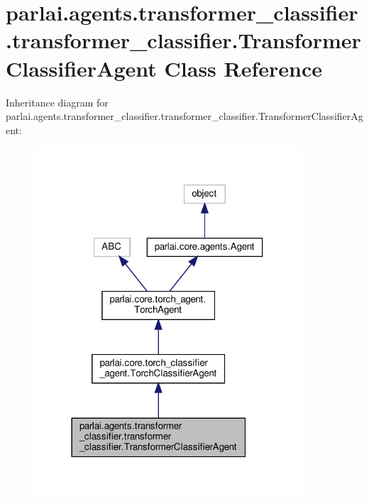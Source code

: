 \hypertarget{classparlai_1_1agents_1_1transformer__classifier_1_1transformer__classifier_1_1TransformerClassifierAgent}{}\section{parlai.\+agents.\+transformer\+\_\+classifier.\+transformer\+\_\+classifier.\+Transformer\+Classifier\+Agent Class Reference}
\label{classparlai_1_1agents_1_1transformer__classifier_1_1transformer__classifier_1_1TransformerClassifierAgent}


Inheritance diagram for parlai.\+agents.\+transformer\+\_\+classifier.\+transformer\+\_\+classifier.\+Transformer\+Classifier\+Agent\+:
\nopagebreak
\begin{figure}[H]
\begin{center}
\leavevmode
\includegraphics[width=282pt]{classparlai_1_1agents_1_1transformer__classifier_1_1transformer__classifier_1_1TransformerClassifierAgent__inherit__graph}
\end{center}
\end{figure}


